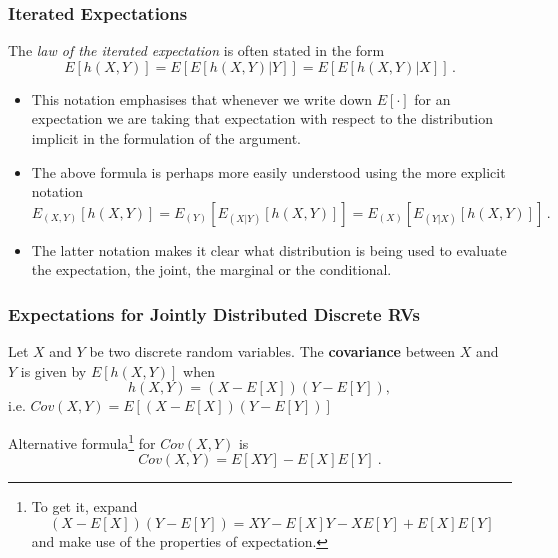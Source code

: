 \documentclass[notes=show,handout]{beamer}\usepackage[]{graphicx}\usepackage[]{color}
\newenvironment{stepitemize}{\begin{itemize}[<+->]}{\end{itemize} }
\begin{document}
\begin{frame}%

\frametitle{Iterated Expectations}

\begin{definition}
The \textit{law of the iterated expectation} is often stated in the
form
\begin{equation*}
E[h(X,Y)]=E[E[h(X,Y)|Y]]=E[E[h(X,Y)|X]]\,.
\end{equation*}
\end{definition}

\begin{stepitemize}

\item This notation emphasises that whenever we write down $E[\cdot]$ for an
expectation we are taking that expectation with respect to the distribution
implicit in the formulation of the argument.

\item The above formula is perhaps more easily understood using the more
explicit notation
\begin{equation*}
E_{(X,Y)}[h(X,Y)]=E_{(Y)}[E_{(X|Y)}[h(X,Y)]]=E_{(X)}[E_{(Y|X)}[h(X,Y)]]\,.
\end{equation*}

\item The latter notation makes it clear what distribution is being used to
evaluate the expectation, the joint, the marginal or the conditional.
\end{stepitemize}

\end{frame}%




\begin{frame}
\frametitle{Expectations for Jointly Distributed Discrete RVs}

\begin{definition}
Let $X$ and $Y$ be two discrete random variables.
The \textbf{covariance} between $X$ and\textbf{\ }$Y$ is given by $%
E\left[ h\left(X,Y\right) \right] $ when%
\begin{equation*}
h\left(X,Y\right) =%
\left(X-E\left[ X\right] \right) \left( Y-E\left[ Y\right] \right),%
\end{equation*}
i.e. $Cov\left(X,Y\right) =E\left[ \left(X-E\left[ X\right] \right)
\left(Y-E\left[ Y\right] \right) \right] $
\end{definition}

Alternative formula\footnote{To get it, expand
$$\left(X-E\left[ X\right] \right) \left( Y-E\left[ Y\right] \right)=XY-E\left[ X\right]Y -XE\left[ Y\right] +E\left[ X\right]E\left[ Y\right]$$ and make use of the properties of expectation.} for $Cov(X,Y)$ is%
\begin{equation}
\boxed{Cov\left( X,Y\right) =E\left[ XY\right] -E\left[ X\right] E\left[ Y\right]\ .} \label{Cov}
\end{equation}

\end{frame}
\end{document}
